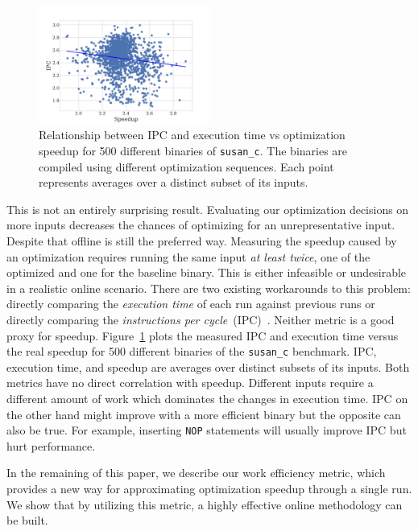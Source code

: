 \begin{figure}[t]
    \centering
    \includegraphics[width=0.5\textwidth]{figs/motivation-metric.pdf}
    \caption{Relationship between IPC and execution time vs optimization speedup for 500 different binaries of \texttt{susan\_c}. The
    binaries are compiled using different optimization sequences. Each point represents averages over a distinct subset of its inputs.}
    \label{fig:motivation-metric}
\end{figure}

This is not an entirely surprising result. Evaluating our optimization decisions on more inputs decreases the chances of optimizing for an
unrepresentative input. Despite that offline \itercomp is still the preferred way. Measuring the speedup caused by an optimization requires
running the same input \textit{at least twice}, one of the optimized and one for the baseline binary. This is either infeasible or
undesirable in a realistic online \itercomp scenario. There are two existing workarounds to this problem: directly comparing the
\textit{execution time} of each run against previous runs or directly comparing the \textit{instructions per cycle}~(IPC)~\citep{fursin07}.
Neither metric is a good proxy for speedup. Figure~\ref{fig:motivation-metric} plots the measured IPC and execution time versus the real
speedup for 500 different binaries of the \texttt{susan\_c} benchmark. IPC, execution time, and speedup are averages over distinct subsets of its inputs.
Both metrics have no direct correlation with speedup. Different inputs require a different amount of work which dominates the changes in execution time. IPC on
the other hand might improve with a more efficient binary but the opposite can also be true. For example,
inserting \texttt{NOP} statements will usually improve IPC but hurt performance.

In the remaining of this paper, we describe our work efficiency metric, which provides a new way for approximating optimization speedup
through a single run. We show that by utilizing this metric, a highly effective online \itercomp methodology can be built.

